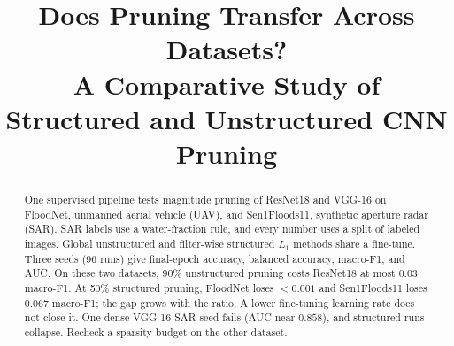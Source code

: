 \documentclass[conference]{IEEEtran}
\begin{document}
\title{Does Pruning Transfer Across Datasets?\\
A Comparative Study of Structured and Unstructured CNN Pruning}

\author{
\and
{}
\and
{}
}
\maketitle

\begin{abstract}
One supervised pipeline tests magnitude pruning of ResNet18 and
VGG-16 on FloodNet, unmanned aerial vehicle (UAV), and Sen1Floods11,
synthetic aperture radar (SAR). SAR labels use a water-fraction rule,
and every number uses a split of labeled images. Global unstructured
and filter-wise structured $L_1$ methods share a fine-tune. Three
seeds (96 runs) give final-epoch accuracy, balanced accuracy,
macro-F1, and AUC. On these two datasets, 90\% unstructured pruning
costs ResNet18 at most $0.03$ macro-F1. At 50\% structured pruning,
FloodNet loses $<0.001$ and Sen1Floods11 loses $0.067$ macro-F1; the
gap grows with the ratio. A lower fine-tuning learning rate does not
close it. One dense VGG-16 SAR seed fails (AUC near $0.858$), and
structured runs collapse. Recheck a sparsity budget on the other
dataset.
\end{abstract}
\end{document}
